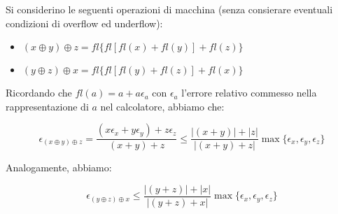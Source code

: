 \begin{center}
\footnotesize\noindent{}\end{center}

Si considerino le seguenti operazioni di macchina (senza consierare eventuali condizioni di overflow ed underflow):

\begin{itemize}

\item \((x \oplus y) \oplus z = fl\{ fl[ fl(x) + fl(y) ] + fl(z)\}\)
\item \((y \oplus z) \oplus x = fl\{ fl[ fl(y) + fl(z) ] + fl(x)\}\)

\end{itemize}

\noindent Ricordando che \(fl(a) = a + a\epsilon_a\) con \(\epsilon_a\) l'errore relativo commesso nella rappresentazione di \(a\) nel calcolatore, abbiamo che:

\[
\epsilon_{(x \oplus y) \oplus z } = \frac{(x \epsilon_x + y \epsilon_y) + z \epsilon_z}{(x+y)+z} \leq \frac{|(x+y)| + |z|}{|(x+y)+z|} \max\{\epsilon_x, \epsilon_y, \epsilon_z\}
\]

\noindent Analogamente, abbiamo:

\[
\epsilon_{(y \oplus z) \oplus x } \leq \frac{ |(y+z)| + |x| }{|(y+z) + x|}\max\{\epsilon_x, \epsilon_y, \epsilon_z\}
\]
